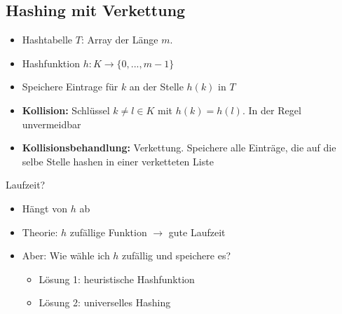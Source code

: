 \subsection{Hashing mit Verkettung}
\begin{itemize}
\item Hashtabelle $T$: Array der Länge $m$.
\item Hashfunktion $h{:} K \to \{0, ..., m-1\}$
\item Speichere Eintrage für $k$ an der Stelle $h(k)$ in $T$
\item \textbf{Kollision:} Schlüssel $k \neq l \in K$ mit $h(k) = h(l)$. In der Regel unvermeidbar
\item \textbf{Kollisionsbehandlung:} Verkettung. Speichere alle Einträge, die auf die selbe Stelle hashen in einer verketteten Liste
\end{itemize}
Laufzeit?
\begin{itemize}
 \item Hängt von $h$ ab
 \item Theorie: $h$ zufällige Funktion $\rightarrow$ gute Laufzeit
 \item Aber: Wie wähle ich $h$ zufällig und speichere es?\\
     \begin{itemize}
      \item Lösung 1: heuristische Hashfunktion
      \item Lösung 2: universelles Hashing
     \end{itemize}
\end{itemize}

